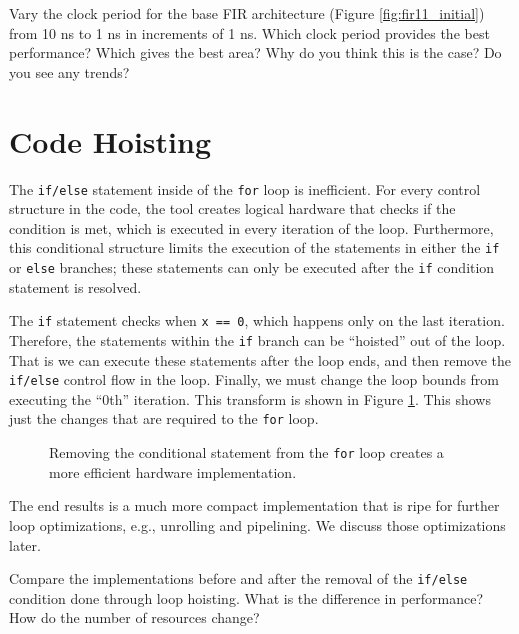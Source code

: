 \begin{exercise}
Vary the clock period for the base FIR architecture (Figure \ref{fig:fir11_initial}) from 10 ns to 1 ns in increments of 1 ns. Which clock period provides the best performance? Which gives the best area? Why do you think this is the case? Do you see any trends? 
\end{exercise}

\section{Code Hoisting}

The \lstinline{if/else} statement inside of the \lstinline{for} loop is inefficient.  For every control structure in the code, the \VHLS tool creates logical hardware that checks if the condition is met, which is executed in every iteration of the loop. Furthermore, this conditional structure limits the execution of the statements in either the \lstinline{if} or \lstinline{else} branches; these statements can only be executed after the \lstinline{if} condition statement is resolved.

The \lstinline{if} statement checks when \lstinline{x == 0}, which happens only on the last iteration. Therefore, the statements within the \lstinline{if} branch can be ``hoisted'' out of the loop. That is we can execute these statements after the loop ends, and then remove the \lstinline{if/else} control flow in the loop. Finally, we must change the loop bounds from executing the ``0th'' iteration. This transform is shown in Figure \ref{fig:fir11_ifelse}. This shows just the changes that are required to the \lstinline{for} loop. 

\begin{figure}

\caption{ Removing the conditional statement from the \lstinline{for} loop creates a more efficient hardware implementation. }
\label{fig:fir11_ifelse}
\end{figure}

The end results is a much more compact implementation that is ripe for further loop optimizations, e.g., unrolling and pipelining. We discuss those optimizations later.

\begin{exercise}
Compare the implementations before and after the removal of the \lstinline{if/else} condition done through loop hoisting. What is the difference in performance? How do the number of resources change?
\end{exercise}

